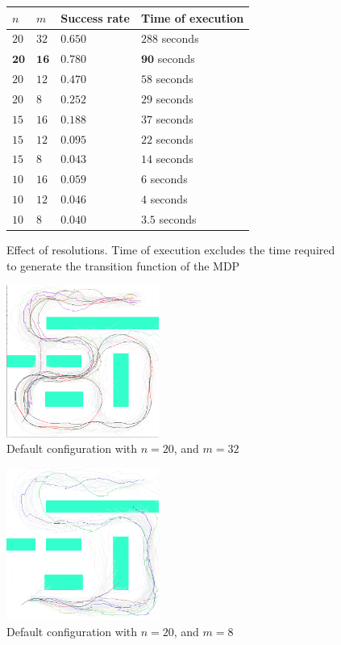 \documentclass[a4paper]{article}
\begin{document}
\begin{figure}
\caption{Effect of resolutions. Time of execution excludes the time required
         to generate the transition function of the MDP}
\label{f:resolution}
\begin{tabular}{ l | l | l | l }
  $n$ & $m$ & Success rate & Time of execution \\ \hline \hline
  $20$ & $32$ & $0.650 $ & $288$ seconds \\ \hline  %
  $\mathbf{20}$ & $\mathbf{16}$ & $\mathbf{0.780}$ & $\mathbf{90}$ seconds \\ \hline
  $20$ & $12$ & $0.470$ & $58$ seconds \\ \hline
  $20$ & $8$ & $0.252$ & $29$ seconds \\ \hline  %

  $15$ & $16$ & $0.188$ & $37$ seconds \\ \hline
  $15$ & $12$ & $0.095$ & $22$ seconds \\ \hline
  $15$ & $8$ & $0.043$ & $14$ seconds \\ \hline

  $10$ & $16$ & $0.059$ & $6$ seconds \\ \hline %
  $10$ & $12$ & $0.046$ & $4$ seconds \\ \hline
  $10$ & $8$ & $0.040$ & $3.5$ seconds \\ \hline %
\end{tabular}
\end{figure}

\begin{figure}
\caption{Default configuration with $n=20$, and $m=32$}
\label{f:b_veryhio}
\centerline{\includegraphics[width=5cm]{b_veryhio.png}}
\end{figure}

\begin{figure}
\caption{Default configuration with $n=20$, and $m=8$}
\label{f:b_lowio}
\centerline{\includegraphics[width=5cm]{b_lowio.png}}
\end{figure}
\end{document}
